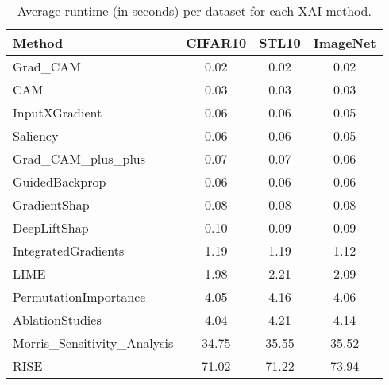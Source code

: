 \begin{table}[ht]
\centering
\begin{tabular}{lccc}
\toprule
Method & CIFAR10 & STL10 & ImageNet \\
\midrule
Grad_CAM & 0.02 & 0.02 & 0.02 \\
CAM & 0.03 & 0.03 & 0.03 \\
InputXGradient & 0.06 & 0.06 & 0.05 \\
Saliency & 0.06 & 0.06 & 0.05 \\
Grad_CAM_plus_plus & 0.07 & 0.07 & 0.06 \\
GuidedBackprop & 0.06 & 0.06 & 0.06 \\
GradientShap & 0.08 & 0.08 & 0.08 \\
DeepLiftShap & 0.10 & 0.09 & 0.09 \\
IntegratedGradients & 1.19 & 1.19 & 1.12 \\
LIME & 1.98 & 2.21 & 2.09 \\
PermutationImportance & 4.05 & 4.16 & 4.06 \\
AblationStudies & 4.04 & 4.21 & 4.14 \\
Morris_Sensitivity_Analysis & 34.75 & 35.55 & 35.52 \\
RISE & 71.02 & 71.22 & 73.94 \\
\bottomrule
\end{tabular}
\caption{Average runtime (in seconds) per dataset for each XAI method.}
\label{tab:runtime_by_dataset}
\end{table}
